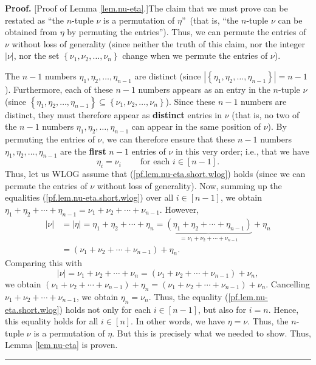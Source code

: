 \documentclass[numbers=enddot,12pt,final,onecolumn,notitlepage,english]{scrartcl}%
\theoremstyle{definition}
\newenvironment{proof}[1][Proof]{\noindent\textbf{#1.} }{\ \rule{0.5em}{0.5em}}
\newenvironment{vershort}{}{}
\begin{document}
\begin{vershort}
\begin{proof}
[Proof of Lemma \ref{lem.nu-eta}.]The claim that we must prove can be restated
as \textquotedblleft the $n$-tuple $\nu$ is a permutation of $\eta
$\textquotedblright\ (that is, \textquotedblleft the $n$-tuple $\nu$ can be
obtained from $\eta$ by permuting the entries\textquotedblright). Thus, we can
permute the entries of $\nu$ without loss of generality (since neither the
truth of this claim, nor the integer $\left\vert \nu\right\vert $, nor the set
$\left\{  \nu_{1},\nu_{2},\ldots,\nu_{n}\right\}  $ change when we permute the
entries of $\nu$).

The $n-1$ numbers $\eta_{1},\eta_{2},\ldots,\eta_{n-1}$ are distinct (since
$\left\vert \left\{  \eta_{1},\eta_{2},\ldots,\eta_{n-1}\right\}  \right\vert
=n-1$). Furthermore, each of these $n-1$ numbers appears as an entry in the
$n$-tuple $\nu$ (since $\left\{  \eta_{1},\eta_{2},\ldots,\eta_{n-1}\right\}
\subseteq\left\{  \nu_{1},\nu_{2},\ldots,\nu_{n}\right\}  $). Since these
$n-1$ numbers are distinct, they must therefore appear as \textbf{distinct}
entries in $\nu$ (that is, no two of the $n-1$ numbers $\eta_{1},\eta
_{2},\ldots,\eta_{n-1}$ can appear in the same position of $\nu$). By
permuting the entries of $\nu$, we can therefore ensure that these $n-1$
numbers $\eta_{1},\eta_{2},\ldots,\eta_{n-1}$ are the \textbf{first }$n-1$
entries of $\nu$ in this very order; i.e., that we have%
\begin{equation}
\eta_{i}=\nu_{i}\ \ \ \ \ \ \ \ \ \ \text{for each }i\in\left[  n-1\right]  .
\label{pf.lem.nu-eta.short.wlog}%
\end{equation}
Thus, let us WLOG assume that (\ref{pf.lem.nu-eta.short.wlog}) holds (since we
can permute the entries of $\nu$ without loss of generality). Now, summing up
the equalities (\ref{pf.lem.nu-eta.short.wlog}) over all $i\in\left[
n-1\right]  $, we obtain $\eta_{1}+\eta_{2}+\cdots+\eta_{n-1}=\nu_{1}+\nu
_{2}+\cdots+\nu_{n-1}$. However,%
\begin{align*}
\left\vert \nu\right\vert  &  =\left\vert \eta\right\vert =\eta_{1}+\eta
_{2}+\cdots+\eta_{n}=\underbrace{\left(  \eta_{1}+\eta_{2}+\cdots+\eta
_{n-1}\right)  }_{=\nu_{1}+\nu_{2}+\cdots+\nu_{n-1}}+\eta_{n}\\
&  =\left(  \nu_{1}+\nu_{2}+\cdots+\nu_{n-1}\right)  +\eta_{n}.
\end{align*}
Comparing this with%
\[
\left\vert \nu\right\vert =\nu_{1}+\nu_{2}+\cdots+\nu_{n}=\left(  \nu_{1}%
+\nu_{2}+\cdots+\nu_{n-1}\right)  +\nu_{n},
\]
we obtain $\left(  \nu_{1}+\nu_{2}+\cdots+\nu_{n-1}\right)  +\eta_{n}=\left(
\nu_{1}+\nu_{2}+\cdots+\nu_{n-1}\right)  +\nu_{n}$. Cancelling $\nu_{1}%
+\nu_{2}+\cdots+\nu_{n-1}$, we obtain $\eta_{n}=\nu_{n}$. Thus, the equality
(\ref{pf.lem.nu-eta.short.wlog}) holds not only for each $i\in\left[
n-1\right]  $, but also for $i=n$. Hence, this equality holds for all
$i\in\left[  n\right]  $. In other words, we have $\eta=\nu$. Thus, the
$n$-tuple $\nu$ is a permutation of $\eta$. But this is precisely what we
needed to show. Thus, Lemma \ref{lem.nu-eta} is proven.
\end{proof}
\end{vershort}
\end{document}
